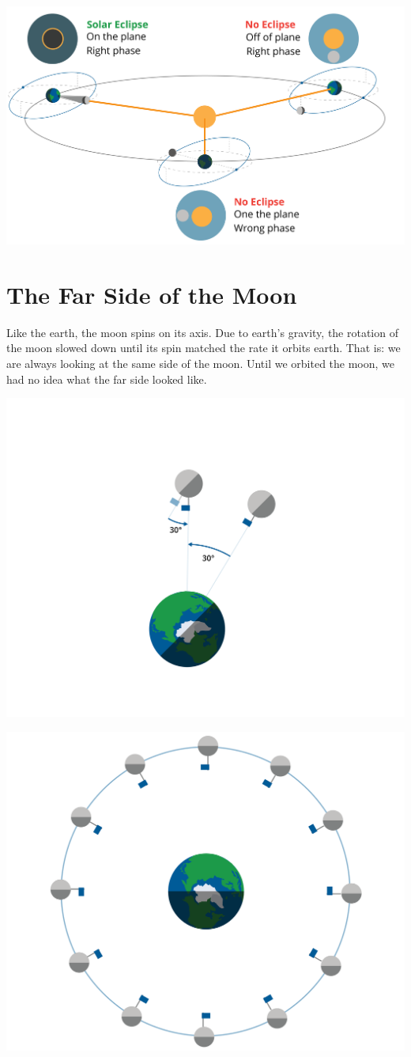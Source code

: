 \includegraphics[width=.75\textwidth]{eclipseOptions.png}

 
\section{The Far Side of the Moon}

Like the earth,  the moon spins on its axis.  Due to earth's gravity,  the rotation of the moon slowed down until its spin matched the rate it orbits earth.  That is: we are always looking at the same side of the moon.  Until we orbited the moon,  we had no idea what the far side looked like.

\includegraphics[width=.75\textwidth]{moonRotate.png}

\includegraphics[width=.75\textwidth]{moonCircleRotate.png}


